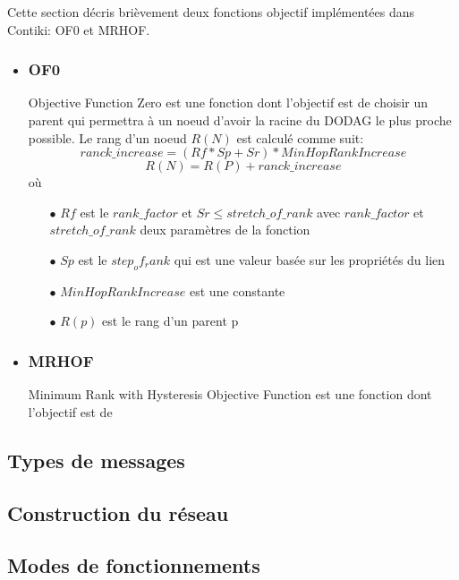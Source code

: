 Cette section décris brièvement deux fonctions objectif implémentées dans Contiki: OF0 et MRHOF.
\begin{itemize}
    \item \subsubsection*{OF0}%
            Objective Function Zero est une fonction dont l'objectif est de choisir un parent qui permettra à un noeud d'avoir la racine du DODAG le plus proche possible. Le rang d'un noeud $R(N)$ est calculé comme suit:
                \[ranck\_increase = (Rf * Sp + Sr) * MinHopRankIncrease\]
                \[R(N) = R(P) + ranck\_increase\]
                où
                \begin{itemize}
                    \item[$\bullet$] $Rf$ est le $rank\_factor$ et $Sr \leq stretch\_of\_rank$ avec $rank\_factor$ et $stretch\_of\_rank$ deux paramètres de la fonction
                    \item[$\bullet$] $Sp$ est le $step_of_rank$ qui est une valeur basée sur les propriétés du lien
                    \item[$\bullet$] $MinHopRankIncrease$ est une constante
                    \item[$\bullet$] $R(p)$ est le rang d'un parent p
                \end{itemize}
                
    \item \subsubsection*{MRHOF}%
            Minimum Rank with Hysteresis Objective Function est une fonction dont l'objectif est de 
\end{itemize}




\subsection*{Types de messages}

\subsection*{Construction du réseau}

\subsection*{Modes de fonctionnements}

